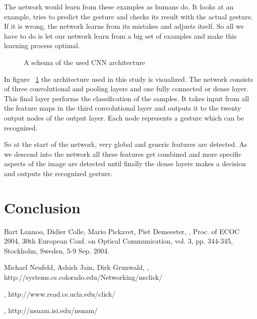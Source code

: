 \documentclass[twocolumn]{phdsymp} %
\begin{document}
The network would learn from these examples as humans do. It looks at an example, tries to predict the gesture and checks its result with the actual gesture. If it is wrong, the network learns from its mistakes and adjusts itself. So all we have to do is let our network learn from a big set of examples and make this learning process optimal.
\begin{figure}[ht]
	\centering
	\caption{A schema of the used CNN architecture}
	\label{fig:schema}
\end{figure}
In figure ~\ref{fig:schema} the architecture used in this study is visualized. The network consists of three convolutional and pooling layers and one fully connected or dense layer. This final layer performs the classification of the samples. It takes input from all the feature maps in the third convolutional layer and outputs it to the twenty output nodes of the output layer. Each node represents a gesture which can be recognized.

So at the start of the network, very global and generic features are detected. As we descend into the network all these features get combined and more specific aspects of the image are detected until finally the dense layers makes a decision and outputs the recognized gesture.


\section{Conclusion}


\nocite{*}



%
\begin{thebibliography}{1}
Bart Lannoo, Didier Colle, Mario Pickavet, Piet Demeester,
,
\newblock Proc. of ECOC 2004, 30th European Conf. on Optical Communication, vol. 3, pp. 344-345, Stockholm, Sweden, 5-9 Sep. 2004.

Michael Neufeld, Ashish Jain, Dirk Grunwald,
,
\newblock http://systems.cs.colorado.edu/Networking/nsclick/

,
\newblock http://www.read.cs.ucla.edu/click/

,
\newblock http://nsnam.isi.edu/nsnam/

\end{thebibliography}
%
\end{document}
